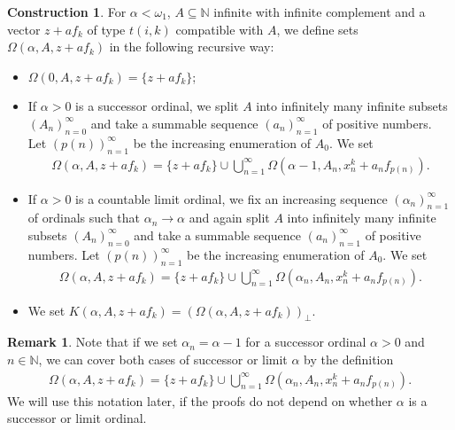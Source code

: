 \documentclass{amsart}
\theoremstyle{definition}
\newtheorem*{remark}{Remark}
\newtheorem{construction}[theorem]{Construction}
\begin{document}
\begin{construction} \label{Construction}
    For $\alpha < \omega_1$, $A \subseteq \mathbb{N}$ infinite with infinite complement and a vector $z + af_k$ of type $t(i,k)$ compatible with $A$, we define sets $\Omega(\alpha,A,z + a f_k)$ in the following recursive way:
    \begin{itemize}
        \item $\Omega(0,A,z + a f_k) = \{z + a f_k\}$;
        \item If $\alpha > 0$ is a successor ordinal, we split $A$ into infinitely many infinite subsets $(A_n)_{n=0}^\infty$ and take a summable sequence $(a_n)_{n=1}^\infty$ of positive numbers. Let $(p(n))_{n=1}^\infty$ be the increasing enumeration of $A_0$. We set
        \begin{align*}
            \Omega(\alpha,A,z + a f_k) = \{z + a f_k\} \cup \bigcup_{n=1}^\infty \Omega(\alpha - 1,A_n,x^k_n + a_n f_{p(n)}).
        \end{align*}
        \item If $\alpha > 0$ is a countable limit ordinal, we fix an increasing sequence $(\alpha_n)_{n=1}^\infty$ of ordinals such that $\alpha_n \rightarrow \alpha$ and again split $A$ into infinitely many infinite subsets $(A_n)_{n=0}^\infty$ and take a summable sequence $(a_n)_{n=1}^\infty$ of positive numbers. Let $(p(n))_{n=1}^\infty$ be the increasing enumeration of $A_0$. We set
        \begin{align*}
            \Omega(\alpha,A,z + a f_k) = \{z + a f_k\} \cup \bigcup_{n=1}^\infty \Omega(\alpha_n,A_n,x^k_n + a_n f_{p(n)}).
        \end{align*}
        \item We set $K(\alpha,A,z + a f_k) = \left(\Omega(\alpha,A,z + a f_k)\right)_\perp$.
    \end{itemize}
\end{construction}

\begin{remark}
    Note that if we set $\alpha_n = \alpha - 1$ for a successor ordinal $\alpha > 0$ and $n \in \mathbb{N}$, we can cover both cases of successor or limit $\alpha$ by the definition
        \begin{align} \tag{$*$} \label{*}
            \Omega(\alpha,A,z + a f_k) = \{z + a f_k\} \cup \bigcup_{n=1}^\infty \Omega(\alpha_n,A_n,x^k_n + a_n f_{p(n)}).
        \end{align}
    We will use this notation later, if the proofs do not depend on whether $\alpha$ is a successor or limit ordinal.
\end{remark}
\end{document}
